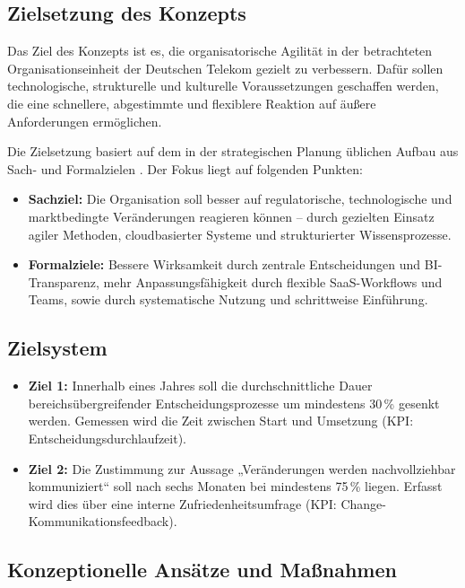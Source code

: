 \documentclass[12pt,a4paper]{article}
\begin{document}
	\subsection{Zielsetzung des Konzepts}
	
	Das Ziel des Konzepts ist es, die organisatorische Agilität in der betrachteten Organisationseinheit der Deutschen Telekom gezielt zu verbessern. Dafür sollen technologische, strukturelle und kulturelle Voraussetzungen geschaffen werden, die eine schnellere, abgestimmte und flexiblere Reaktion auf äußere Anforderungen ermöglichen.
	
	\noindent Die Zielsetzung basiert auf dem in der strategischen Planung üblichen Aufbau aus Sach- und Formalzielen \parencite{StelzerDirk1962-2011I:GA}. Der Fokus liegt auf folgenden Punkten:
	
	\begin{itemize}
		\item \textbf{Sachziel:} Die Organisation soll besser auf regulatorische, technologische und marktbedingte Veränderungen reagieren können – durch gezielten Einsatz agiler Methoden, cloudbasierter Systeme und strukturierter Wissensprozesse.
		\item \textbf{Formalziele:} Bessere Wirksamkeit durch zentrale Entscheidungen und BI-Transparenz, mehr Anpassungsfähigkeit durch flexible SaaS-Workflows und Teams, sowie durch systematische Nutzung und schrittweise Einführung.
	\end{itemize}
	
	\subsection{Zielsystem}\label{sec:zielsystem}
	
	\begin{itemize}
		\item \textbf{Ziel 1:} Innerhalb eines Jahres soll die durchschnittliche Dauer bereichsübergreifender Entscheidungsprozesse um mindestens 30\,\% gesenkt werden. Gemessen wird die Zeit zwischen Start und Umsetzung (KPI: Entscheidungsdurchlaufzeit).
		
		\item \textbf{Ziel 2:} Die Zustimmung zur Aussage „Veränderungen werden nachvollziehbar kommuniziert“ soll nach sechs Monaten bei mindestens 75\,\% liegen. Erfasst wird dies über eine interne Zufriedenheitsumfrage (KPI: Change-Kommunikationsfeedback).
	\end{itemize}
	
	\subsection{Konzeptionelle Ansätze und Maßnahmen}
	
\end{document}
